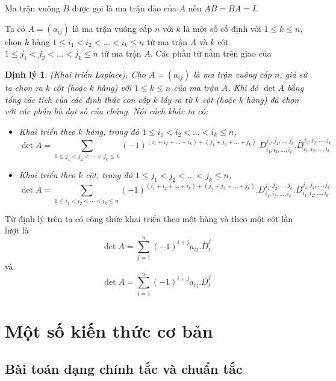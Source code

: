 \documentclass[12pt,a4paper]{report}
\newtheorem{dl}{Định lý}
\begin{document}
Ma trận vuông $B$ được gọi là ma trận đảo của $A$ nếu $AB=BA=I$.

Ta có $A = (a_{ij})$ là ma trận vuông cấp $n$ với $k$ là một số cố định với $1 \leq k \leq n$, chọn $k$ hàng $1 \leq i_1 < i_2 < \ldots < i_k \leq n$ từ ma trận $A$ và $k$ cột $1 \leq j_1 < j_2 < \ldots < j_k \leq n$ từ ma trận $A$. Các phần từ nằm trên giao của 

\begin{dl}{(Khai triển Laplace).}
Cho $A= (a_{ij})$ là ma trận vuông cấp $n$, giả sử ta chọn ra $k$ cột (hoặc $k$ hàng) với $1 \leq k \leq n$ của ma trận $A$. Khi đó $\det A$ bằng tổng các tích của các định thức con cấp $k$ lấy ra từ $k$ cột (hoặc $k$ hàng) đã chọn với các phần bù đại số của chúng. Nói cách khác ta có:
\begin{itemize}
\item Khai triển theo $k$ hàng, trong đó $1 \leq i_1 < i_2 < \ldots < i_k \leq n$,
\begin{equation*}
    \det A = \sum _{1 \leq j_1 < j_2 < \cdots < j_k \leq n} (-1)^{(i_1+i_2+\ldots+i_k) + (j_1+j_2+\ldots+j_k)} . D_{i_1,i_2,\ldots,i_k}^{j_1,j_2,\ldots,j_k} . \overline{D}_{i_1,i_2,\ldots,i_k}^{j_1,j_2,\ldots,j_k}
\end{equation*}
\item Khai triển theo $k$ cột, trong đó $1 \leq j_1 < j_2 < \ldots < j_k \leq n$,
\begin{equation*}
    \det A = \sum _{1 \leq i_1 < i_2 < \cdots < i_k \leq n} (-1)^{(i_1+i_2+\ldots+i_k) + (j_1+j_2+\ldots+j_k)} . D_{i_1,i_2,\ldots,i_k}^{j_1,j_2,\ldots,j_k} . \overline{D}_{i_1,i_2,\ldots,i_k}^{j_1,j_2,\ldots,j_k}
\end{equation*}
\end{itemize}
\end{dl}

Từ định lý trên ta có công thức khai triển theo một hàng và theo một cột lần lượt là
\begin{equation}
\det A = \sum_{j=1}^n (-1)^{i+j}a_{ij} . \overline{D}_i^j
\end{equation}
và
\begin{equation}
\det A = \sum_{i=1}^n (-1)^{i+j}a_{ij} . \overline{D}_i^j
\end{equation}


\section{Một số kiến thức cơ bản}

\subsection{Bài toán dạng chính tắc và chuẩn tắc}
\end{document}
